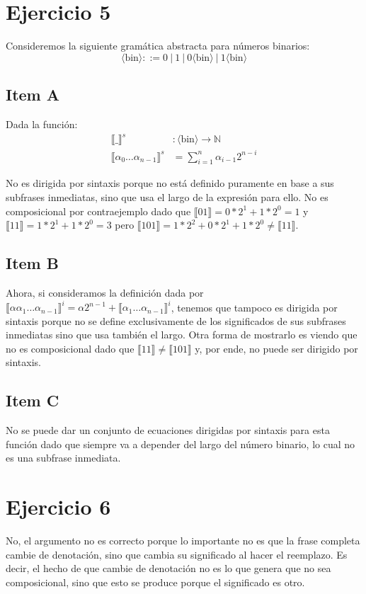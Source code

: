 \documentclass{article}
\newcommand{\aexp}[1]{\langle\text{#1}\rangle}
\newcommand{\sem}[1]{\llbracket #1\rrbracket}
\newcommand{\N}{\mathbb{N}}
\begin{document}
\section*{Ejercicio 5}
Consideremos la siguiente gramática abstracta para números binarios:
\begin{equation*}
	\aexp{bin} ::= 0\ |\ 1\ |\ 0\aexp{bin}\ |\ 1\aexp{bin}
\end{equation*}

\subsection*{Item A}
Dada la función:
\begin{equation*}
	\begin{aligned}
		\sem{\_}^s                        & : \aexp{bin} \to \N                       \\
		\sem{\alpha_0\dots\alpha_{n-1}}^s & = \sum\limits_{i=1}^n \alpha_{i-1}2^{n-i}
	\end{aligned}
\end{equation*}

No es dirigida por sintaxis porque no está definido puramente en base a sus subfrases inmediatas, sino que usa el largo de la expresión para ello.
No es composicional por contraejemplo dado que $\sem{01}=0*2^1+1*2^0=1$ y $\sem{11}=1*2^1+1*2^0=3$ pero $\sem{101}=1*2^2+0*2^1+1*2^0\neq\sem{11}$.

\subsection*{Item B}
Ahora, si consideramos la definición dada por $\sem{\alpha\alpha_1\dots\alpha_{n-1}}^i = \alpha 2^{n-1}+\sem{\alpha_1\dots\alpha_{n-1}}^i$, tenemos que tampoco es dirigida por sintaxis porque no se define exclusivamente de los significados de sus subfrases inmediatas sino que usa también el largo.
Otra forma de mostrarlo es viendo que no es composicional dado que $\sem{11}\neq\sem{101}$ y, por ende, no puede ser dirigido por sintaxis.

\subsection*{Item C}
No se puede dar un conjunto de ecuaciones dirigidas por sintaxis para esta función dado que siempre va a depender del largo del número binario, lo cual no es una subfrase inmediata.

\section*{Ejercicio 6}
No, el argumento no es correcto porque lo importante no es que la frase completa cambie de denotación, sino que cambia su significado al hacer el reemplazo.
Es decir, el hecho de que cambie de denotación no es lo que genera que no sea composicional, sino que esto se produce porque el significado es otro.
\end{document}
